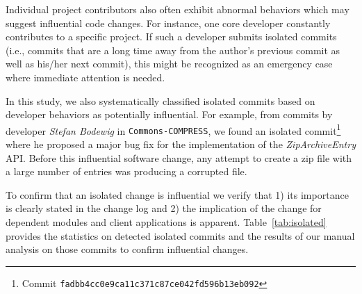 
Individual project contributors also often exhibit abnormal
behaviors which may suggest influential code changes.
For instance, one core developer constantly contributes
 to a specific project. If such a developer
submits isolated commits (i.e., commits that are a long time away from
the author's previous commit as well as his/her next commit), this
might be recognized as an emergency case where immediate attention is needed. 

In this study, we also systematically classified isolated commits based on
developer behaviors as potentially influential. For example, from commits by
developer {\em Stefan Bodewig} in {\tt Commons-COMPRESS}, we found an isolated
commit\footnote{Commit \tt\small fadbb4cc0e9ca11c371c87ce042fd596b13eb092}
where he proposed a major bug fix for the implementation of the {\em
ZipArchiveEntry} API. Before this influential software change, any attempt to create a
zip file with a large number of entries was producing a corrupted file.





To confirm that an isolated change is influential we verify that 1) its importance is clearly stated in the change log and
2) the implication of the change for dependent modules and client applications is apparent.
Table~\ref{tab:isolated} provides the statistics on detected isolated commits
and the results of our manual analysis on those  commits to confirm influential changes.


